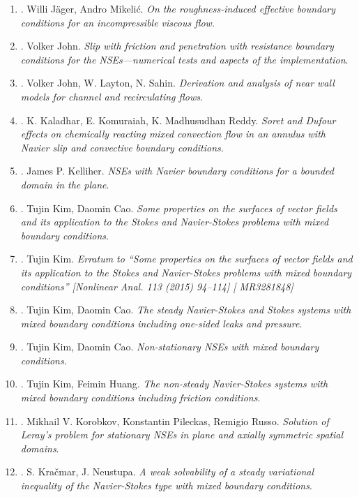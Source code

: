 \documentclass{article}
\begin{document}
\begin{enumerate}
	\item \cite{Jager_Mikelic2001}. {\sc Willi J\"{a}ger, Andro Mikeli\'{c}}. {\it On the roughness-induced effective boundary conditions for an incompressible viscous flow}.
	\item \cite{John2002}. {\sc Volker John}. {\it Slip with friction and penetration with resistance boundary conditions for the NSEs---numerical tests and aspects of the implementation}.
	\item \cite{John_Layton_Sahin2004}. {\sc Volker John, W. Layton, N. Sahin}. {\it Derivation and analysis of near wall models for channel and recirculating flows}.
	\item \cite{Kaladhar_Komuraiah_Madhusudhan-Reddy2019}. {\sc K. Kaladhar, E. Komuraiah, K. Madhusudhan Reddy}. {\it Soret and Dufour effects on chemically reacting mixed convection flow in an annulus with {N}avier slip and convective boundary conditions}.
	\item \cite{Kelliher2006}. {\sc James P. Kelliher}. {\it NSEs with Navier boundary conditions for a bounded domain in the plane}.
	\item \cite{Kim_Cao2015}. {\sc Tujin Kim, Daomin Cao}. {\it Some properties on the surfaces of vector fields and its application to the Stokes and Navier-Stokes problems with mixed boundary conditions}.
	\item \cite{Kim2016}. {\sc Tujin Kim}. {\it Erratum to ``Some properties on the surfaces of vector fields and its application to the Stokes and Navier-Stokes problems with mixed boundary conditions'' [{N}onlinear {A}nal. 113 (2015) 94--114] [ {MR}3281848]}
	\item \cite{Kim_Cao2016}. {\sc Tujin Kim, Daomin Cao}. {\it The steady {N}avier-{S}tokes and Stokes systems with mixed boundary conditions including one-sided leaks and pressure}.
	\item \cite{Kim_Cao2017}. {\sc Tujin Kim, Daomin Cao}. {\it Non-stationary NSEs with mixed boundary conditions}.
	\item \cite{Kim_Huang2018}. {\sc Tujin Kim, Feimin Huang}. {\it The non-steady Navier-Stokes systems with mixed boundary conditions including friction conditions}.
	\item \cite{Korobkov_Pileckas_Russo2015}. {\sc Mikhail V. Korobkov, Konstantin Pileckas, Remigio Russo}. {\it Solution of Leray's problem for stationary NSEs in plane and axially symmetric spatial domains}.
	\item \cite{Kracmar_Neustupa2001}. {\sc S. Kra\v{c}mar, J. Neustupa}. {\it A weak solvability of a steady variational inequality of the Navier-Stokes type with mixed boundary conditions}.

\end{enumerate}
\end{document}
